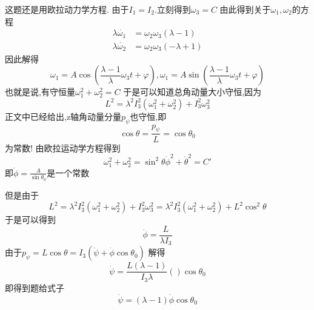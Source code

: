 \begin{solution}
    这题还是用欧拉动力学方程.
    由于$I_1=I_2$.立刻得到$\omega_3=C$
    由此得到关于$\omega_1,\omega_2$的方程
    \begin{align*}
        \lambda\dot{\omega_1}&=\omega_2\omega_3(\lambda-1)\\
        \lambda\dot{\omega_2}&=\omega_2\omega_3(-\lambda+1)
    \end{align*}
    因此解得
    $$\omega_1=A\cos(\frac{\lambda-1}{\lambda}\omega_3 t+\varphi),\omega_1=A\sin(\frac{\lambda-1}{\lambda}\omega_3 t+\varphi)$$
    也就是说,有守恒量$\omega_1^2+\omega_2^2=C$
    于是可以知道总角动量大小守恒,因为
    $$L^2=\lambda^2 I_3^2(\omega_1^2+\omega_2^2)+I_3^2\omega_3^2$$
    正文中已经给出,z轴角动量分量$p_\psi$也守恒,即
    $$\cos\theta=\frac{p_\psi}{L}=\cos\theta_0$$
    为常数!
    由欧拉运动学方程得到
    $$\omega_1^2+\omega_2^2=\sin^2\theta\dot\phi^2+\dot\theta^2=C'$$
    即$\dot\phi=\frac{A}{\sin\theta_0}$是一个常数
    
    但是由于$$L^2=\lambda^2I_3^2(\omega_1^2+\omega_2^2)+I_3^2\omega_3^2=\lambda^2 I_3^2(\omega_1^2+\omega_2^2)+L^2\cos^2\theta$$
    于是可以得到
    $$\dot\phi=\frac{L}{\lambda I_3}$$
    由于$p_\psi=L\cos\theta=I_3(\dot\psi+\dot\phi\cos\theta_0)$
    解得
    $$\dot\psi=\frac{L(\lambda-1)}{I_3\lambda}()\cos\theta_0$$
    即得到题给式子
    $$\dot\psi=(\lambda-1)\dot\phi\cos\theta_0$$
\end{solution}